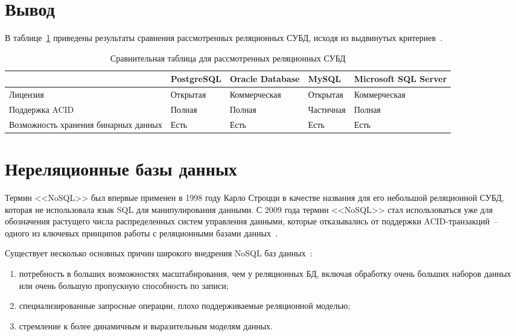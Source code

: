 \section*{Вывод}

В таблице~\ref{table:compareRelDBs} приведены результаты сравнения рассмотренных реляционных СУБД, исходя из выдвинутых критериев~\cite{cmpSCDB6}.
\begin{table}[h!]
	\begin{center}
		\caption{\label{table:compareRelDBs} Сравнительная таблица для рассмотренных реляционных СУБД}
		\begin{tabularx}{\textwidth}{|X|X|X|X|X|}
			\hline
			~ & PostgreSQL & Oracle Database & MySQL & Microsoft SQL Server \\ \hline
			Лицензия & Открытая & Коммерческая & Открытая & Коммерческая \\ \hline
			Поддержка ACID & Полная & Полная & Частичная & Полная \\ \hline
			Возможность хранения бинарных данных & Есть & Есть & Есть & Есть \\ \hline
		\end{tabularx}
	\end{center}
\end{table}

\section{Нереляционные базы данных}

Термин <<NoSQL>> был впервые применен в 1998 году Карло Строцци в качестве названия для его небольшой реляционной СУБД, которая не использовала язык SQL для манипулирования данными.
С 2009 года термин <<NoSQL>> стал использоваться уже для обозначения растущего числа распределенных систем управления данными, которые отказывались от поддержки ACID-транзакций~-- одного из ключевых принципов работы с реляционными базами данных~\cite{nosql}.

Существует несколько основных причин широкого внедрения NoSQL баз данных~\cite{highloadApps}:
\begin{enumerate}
	\item потребность в больших возможностях масштабирования, чем у реляционных БД, включая обработку очень больших наборов данных или очень большую пропускную способность по записи;
	\item специализированные запросные операции, плохо поддерживаемые реляционной моделью;
	\item стремление к более динамичным и выразительным моделям данных.
\end{enumerate}

